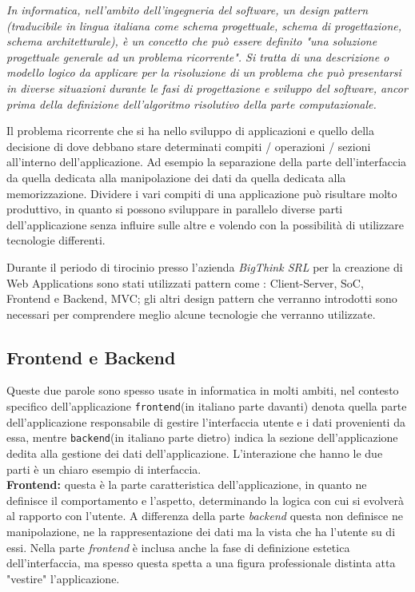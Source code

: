 \emph{In informatica, nell'ambito dell'ingegneria del software, un design pattern (traducibile in lingua italiana come schema progettuale, schema di progettazione, schema architetturale), è un concetto che può essere definito "una soluzione progettuale generale ad un problema ricorrente". Si tratta di una descrizione o modello logico da applicare per la risoluzione di un problema che può presentarsi in diverse situazioni durante le fasi di progettazione e sviluppo del software, ancor prima della definizione dell'algoritmo risolutivo della parte computazionale.}
\hspace*{\fill}\cite{wiki:design_pattern} 

Il problema ricorrente che si ha nello sviluppo di applicazioni e quello della decisione di dove debbano stare determinati compiti / operazioni / sezioni all'interno dell'applicazione. Ad esempio la separazione della parte dell'interfaccia da quella dedicata alla manipolazione dei dati da quella dedicata alla memorizzazione. Dividere i vari compiti di una applicazione può risultare molto produttivo, in quanto si possono sviluppare in parallelo diverse parti dell'applicazione senza influire sulle altre e volendo con la possibilità di utilizzare tecnologie differenti.

Durante il periodo di tirocinio presso l'azienda \emph{BigThink SRL} per la creazione di Web Applications sono stati utilizzati pattern come : Client-Server, SoC, Frontend e Backend, MVC; gli altri design pattern che verranno introdotti sono necessari per comprendere meglio alcune tecnologie che verranno utilizzate.
 
\subsection{Frontend e Backend}
Queste due parole sono spesso usate in informatica in molti ambiti, nel contesto specifico dell'applicazione \texttt{frontend}(in italiano parte davanti) denota quella parte dell'applicazione responsabile di gestire l'interfaccia utente e i dati provenienti da essa, mentre \texttt{backend}(in italiano parte dietro) indica la sezione dell'applicazione dedita alla gestione dei dati dell'applicazione. L'interazione che hanno le due parti è un chiaro esempio di interfaccia.\\

\textbf{Frontend:} questa è la parte caratteristica dell'applicazione, in quanto ne definisce il comportamento e l'aspetto, determinando la logica con cui si evolverà al rapporto con l'utente. A differenza della parte \emph{backend} questa non definisce ne manipolazione, ne la rappresentazione dei dati ma la vista che ha l'utente su di essi. Nella parte \emph{frontend} è inclusa anche la fase di definizione estetica dell'interfaccia, ma spesso questa spetta a una figura professionale distinta atta "vestire" l'applicazione.\\

